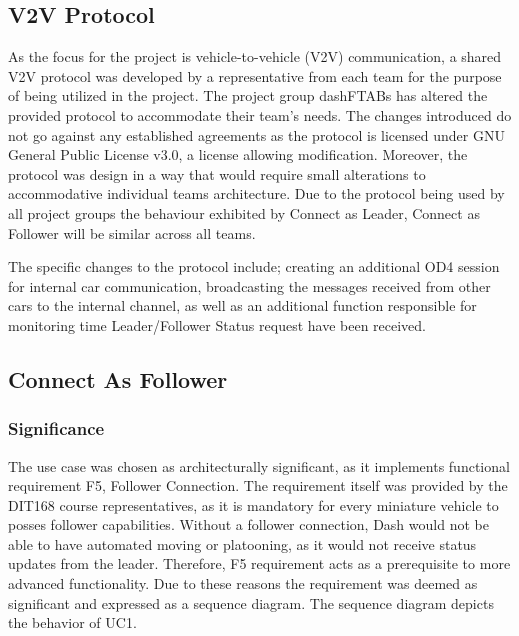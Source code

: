 \documentclass[12pt]{article}
\begin{document}
\subsection{V2V Protocol}
As the focus for the project is vehicle-to-vehicle (V2V) communication, a shared V2V protocol was developed by a representative from each team for the purpose of being utilized in the project. The project group dashFTABs has altered the provided protocol to accommodate their team's needs. The changes introduced do not go against any established agreements as the protocol is licensed under GNU General Public License v3.0, a license allowing modification. Moreover, the protocol was design in a way that would require small alterations to accommodative individual teams architecture. Due to the protocol being used by all project groups the behaviour exhibited by Connect as Leader, Connect as Follower will be similar across all teams.\par
The specific changes to the protocol include; creating an additional OD4 session for internal car communication, broadcasting the messages received from other cars to the internal channel, as well as an additional function responsible for monitoring time Leader/Follower Status request have been received. \par  

\subsection{Connect As Follower}
\subsubsection{Significance}
 The use case was chosen as architecturally significant, as it implements functional requirement F5, Follower Connection. The requirement itself was provided by the DIT168 course representatives, as it is mandatory for every miniature vehicle to posses follower capabilities. Without a follower connection, Dash would not be able to have automated moving or platooning, as it would not receive status updates from the leader. Therefore, F5 requirement acts as a prerequisite to more advanced functionality. Due to these reasons the requirement was deemed as significant and expressed as a sequence diagram. The sequence diagram depicts the behavior of UC1.\par
\end{document}

